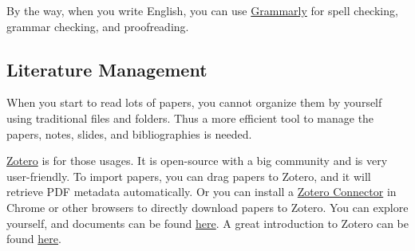 \documentclass[english]{../TexTemplate/thesis}
\begin{document}
By the way, when you write English, you can use \href{https://www.grammarly.com/}{Grammarly} for spell checking, grammar checking, and proofreading.

\subsection{Literature Management}
When you start to read lots of papers, you cannot organize them by yourself using traditional files and folders.
Thus a more efficient tool to manage the papers, notes, slides, and bibliographies is needed.

\href{https://www.zotero.org}{Zotero} is for those usages.
It is open-source with a big community and is very user-friendly.
To import papers, you can drag papers to Zotero, and it will retrieve PDF metadata automatically. Or you can install a \href{https://chrome.google.com/webstore/detail/zotero-connector/ekhagklcjbdpajgpjgmbionohlpdbjgc}{Zotero Connector} in Chrome or other browsers to directly download papers to Zotero. You can explore yourself, and documents can be found \href{https://www.zotero.org/support/}{here}.
A great introduction to Zotero can be found \href{https://speakerdeck.com/markding/collecting-organizing-and-citing-scientific-literature-an-intro-to-zotero}{here}.


\newpage
\end{document}
